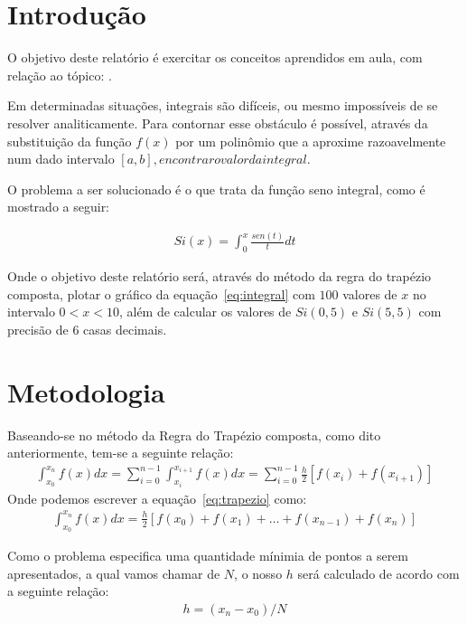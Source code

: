 \documentclass[12pt, hidelinks]{article}
\makeatletter
\let\thetitle\@title
\makeatother
\begin{document}
\section{Introdução}

O objetivo deste relatório é exercitar os conceitos aprendidos em aula, com relação ao tópico: \thetitle.

Em determinadas situações, integrais são difíceis, ou mesmo impossíveis de se resolver analiticamente. Para contornar esse obstáculo é possível, através da substituição da função $f(x)$ por um polinômio que a aproxime razoavelmente num dado intervalo $[a, b], encontrar o valor da integral$.

O problema a ser solucionado é o que trata da função seno integral, como é mostrado a seguir:

\begin{eqnarray}\label{eq:integral}
  Si(x) = \int_{0}^{x} \frac{sen(t)}{t}dt
\end{eqnarray}

Onde o objetivo deste relatório será, através do método da regra do trapézio composta, plotar o gráfico da equação~\eqref{eq:integral} com $100$ valores de $x$ no intervalo $0 < x < 10$, além de calcular os valores de $Si(0,5)$ e $Si(5,5)$ com precisão de $6$ casas decimais.

\section{Metodologia}
Baseando-se no método da Regra do Trapézio composta, como dito anteriormente, tem-se a seguinte relação:
\begin{eqnarray}\label{eq:trapezio}
  \int_{x_0}^{x_n} f(x)dx = \sum\limits_{i=0}^{n-1}\int_{x_i}^{x_{i+1}} f(x)dx = \sum\limits_{i=0}^{n-1}\frac{h}{2}[f(x_i) + f(x_{i+1})]
\end{eqnarray}
Onde podemos escrever a equação~\eqref{eq:trapezio} como:
\begin{eqnarray}\label{eq:trapcomposta}
  \int_{x_0}^{x_n} f(x)dx = \frac{h}{2}[f(x_0) + f(x_1) + \hdots + f(x_{n-1}) + f(x_n)]
\end{eqnarray}

Como o problema especifica uma quantidade mínimia de pontos a serem apresentados, a qual vamos chamar de $N$, o nosso $h$ será calculado de acordo com a seguinte relação:
\begin{eqnarray}\label{eq:h}
  h = (x_n - x_0)/N
\end{eqnarray}
\end{document}
